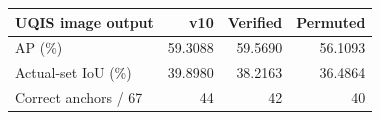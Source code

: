 \begin{tabular}{lrrr}
\toprule
UQIS image output & v10 & Verified & Permuted \\
\midrule
AP (\%) & 59.3088 & 59.5690 & 56.1093 \\
Actual-set IoU (\%) & 39.8980 & 38.2163 & 36.4864 \\
Correct anchors / 67 & 44 & 42 & 40 \\
\bottomrule
\end{tabular}
